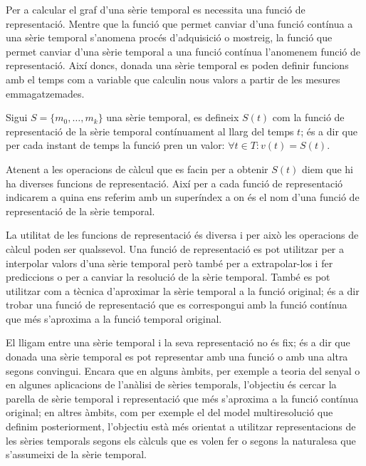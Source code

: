 Per a calcular el graf d'una sèrie temporal es necessita una funció de
representació. Mentre que la funció que permet canviar d'una funció
contínua a una sèrie temporal s'anomena procés d'adquisició o
mostreig, la funció que permet canviar d'una sèrie temporal a una
funció contínua l'anomenem funció de representació.  Així doncs,
donada una sèrie temporal es poden definir funcions amb el temps com a
variable que calculin nous valors a partir de les mesures
emmagatzemades.
\begin{definition}
  Sigui $S=\{m_0,\ldots,m_k\}$ una sèrie temporal, es defineix $S(t)$
  com la funció de representació de la sèrie temporal contínuament al
  llarg del temps $t$; és a dir que per cada instant de temps la
  funció pren un valor: $\forall t\in T: v(t) = S(t)$. 

  Atenent a les operacions de càlcul que es facin per a obtenir $S(t)$
  diem que hi ha diverses funcions de representació. Així per a cada
  funció de representació indicarem a quina ens referim amb un
  superíndex  a on
   és el nom d'una funció de representació
  de la sèrie temporal.
\end{definition}

La utilitat de les funcions de representació és diversa i per això les
operacions de càlcul poden ser qualssevol. Una funció de representació
es pot utilitzar per a interpolar valors d'una sèrie temporal però
també per a extrapolar-los i fer prediccions o per a canviar la
resolució de la sèrie temporal. També es pot utilitzar com a tècnica
d'aproximar la sèrie temporal a la funció original; és a dir trobar
una funció de representació que es correspongui amb la funció contínua
que més s'aproxima a la funció temporal original.


El lligam entre una sèrie temporal i la seva representació no és fix;
és a dir que donada una sèrie temporal es pot representar amb una
funció o amb una altra segons convingui.  Encara que en alguns àmbits,
per exemple a teoria del senyal o en algunes aplicacions de l'anàlisi
de sèries temporals, l'objectiu és cercar la parella de sèrie temporal
i representació que més s'aproxima a la funció contínua original; en
altres àmbits, com per exemple el del model multiresolució que definim
posteriorment, l'objectiu està més orientat a utilitzar
representacions de les sèries temporals segons els càlculs que es
volen fer o segons la naturalesa que s'assumeixi de la sèrie temporal.


